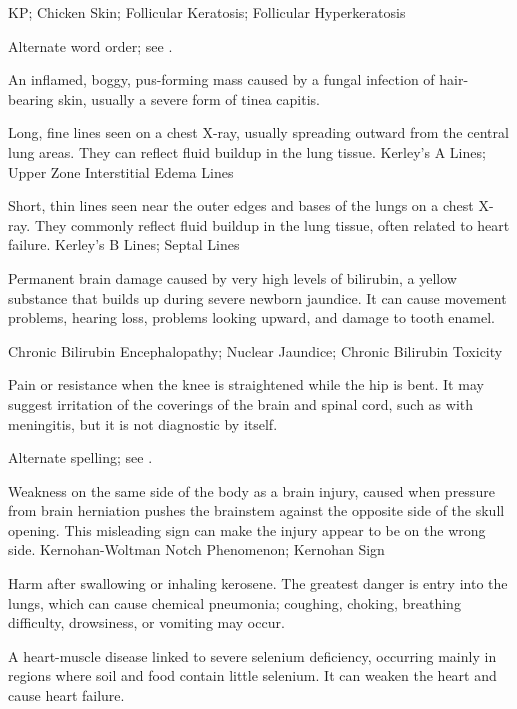 \synonyms
KP; Chicken Skin; Follicular Keratosis; Follicular Hyperkeratosis

 Alternate word order; see .

 An inflamed, boggy, pus-forming mass caused by a fungal infection of hair-bearing skin, usually a severe form of tinea capitis.

 Long, fine lines seen on a chest X-ray, usually spreading outward from the central lung areas. They can reflect fluid buildup in the lung tissue.
\synonyms
Kerley's A Lines; Upper Zone Interstitial Edema Lines

 Short, thin lines seen near the outer edges and bases of the lungs on a chest X-ray. They commonly reflect fluid buildup in the lung tissue, often related to heart failure.
\synonyms
Kerley's B Lines; Septal Lines

 Permanent brain damage caused by very high levels of bilirubin, a yellow substance that builds up during severe newborn jaundice. It can cause movement problems, hearing loss, problems looking upward, and damage to tooth enamel.

\synonyms
Chronic Bilirubin Encephalopathy; Nuclear Jaundice; Chronic Bilirubin Toxicity

 Pain or resistance when the knee is straightened while the hip is bent. It may suggest irritation of the coverings of the brain and spinal cord, such as with meningitis, but it is not diagnostic by itself.

 Alternate spelling; see .

 Weakness on the same side of the body as a brain injury, caused when pressure from brain herniation pushes the brainstem against the opposite side of the skull opening. This misleading sign can make the injury appear to be on the wrong side.
\synonyms
Kernohan-Woltman Notch Phenomenon; Kernohan Sign

 Harm after swallowing or inhaling kerosene. The greatest danger is entry into the lungs, which can cause chemical pneumonia; coughing, choking, breathing difficulty, drowsiness, or vomiting may occur.

 A heart-muscle disease linked to severe selenium deficiency, occurring mainly in regions where soil and food contain little selenium. It can weaken the heart and cause heart failure.

